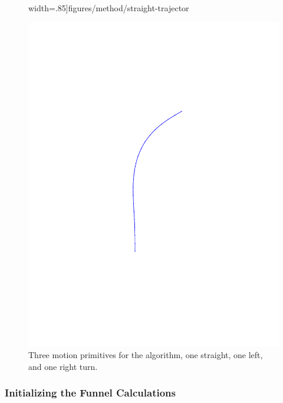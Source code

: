 \begin{figure}[!t]
\begin{minipage}[t]{0.3\linewidth}
    width=.85\linewidth]{figures/method/straight-trajector}
  \end{minipage}
  \hfill
  \begin{minipage}[t]{0.3\linewidth}
    \includegraphics[trim={5cm 5cm 5cm 5cm},
    width=.85\linewidth]{figures/method/right-trajector}
  \end{minipage}
  \caption[Three motion primitives for the \rrtfunnel{} algorithm]{Three motion primitives for the \rrtfunnel{} algorithm, one straight,
    one left, and one right turn.}
  \label{fig:initial-trajectories}
\end{figure}


\subsubsection{Initializing the Funnel Calculations}
\label{subsec:initializing-tvlqr}

